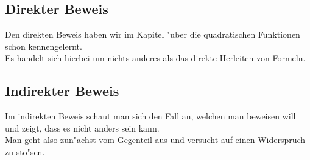 \subsection{Direkter Beweis}
Den direkten Beweis haben wir im Kapitel "uber die quadratischen Funktionen schon kennengelernt.\\
Es handelt sich hierbei um nichts anderes als das direkte Herleiten von Formeln.

\subsection{Indirekter Beweis}
Im indirekten Beweis schaut man sich den Fall an, welchen man beweisen will und zeigt, dass es nicht anders sein kann.\\
Man geht also zun"achst vom Gegenteil aus und versucht auf einen Widerspruch zu sto"sen.\\

